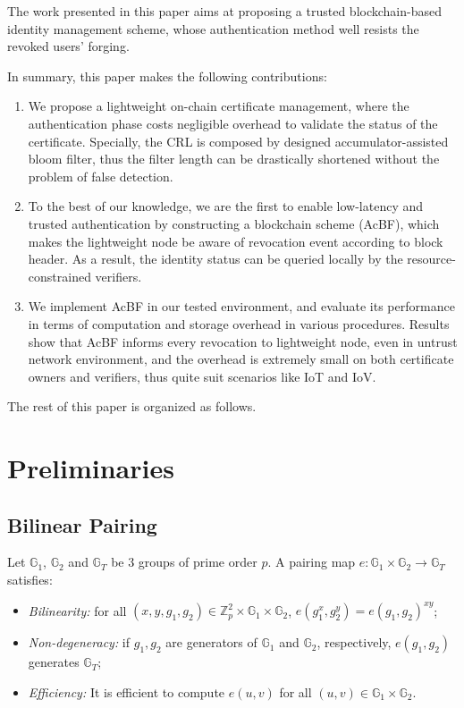 \documentclass[conference]{IEEEtran}
\begin{document}
The work presented in this paper aims at proposing a trusted blockchain-based identity management scheme, whose authentication method well resists the revoked users' forging. 

In summary, this paper makes the following contributions:
\begin{enumerate}
	\item We propose a lightweight on-chain certificate management, where the authentication phase costs negligible overhead to validate the status of the certificate. Specially, the CRL is composed by designed accumulator-assisted bloom filter, thus the filter length can be drastically shortened without the problem of false detection. 
	\item To the best of our knowledge, we are the first to enable low-latency and trusted authentication by constructing a blockchain scheme (AcBF), which makes the lightweight node be aware of revocation event according to block header. As a result, the identity status can be queried locally by the resource-constrained verifiers.
	\item We implement AcBF in our tested environment, and evaluate its performance in terms of computation and storage overhead in various procedures. Results show that AcBF informs every revocation to lightweight node, even in untrust network environment, and the overhead is extremely small on both certificate owners and verifiers, thus quite suit scenarios like IoT and IoV.
\end{enumerate}

The rest of this paper is organized as follows. 


\section{Preliminaries}

\subsection{Bilinear Pairing}
Let $\mathbb{G}_1$, $\mathbb{G}_2$ and $\mathbb{G}_T$ be 3 groups of prime order $p$. A pairing map $e:\mathbb{G}_1\times \mathbb{G}_2\rightarrow\mathbb{G}_T$ satisfies:
\begin{itemize}
	\item \textit{Bilinearity:} for all $(x,y, g_1, g_2) \in \mathbb{Z}_p^2\times \mathbb{G}_1\times \mathbb{G}_2$, $e(g_1^x, g_2^y) = e(g_1, g_2)^{xy}$;
	\item \textit{Non-degeneracy:} if $g_1, g_2$ are generators of $\mathbb{G}_1$ and $\mathbb{G}_2$, respectively, $e(g_1, g_2)$ generates $\mathbb{G}_T$;
	\item \textit{Efficiency:} It is efficient to compute $e(u,v)$ for all $(u, v) \in \mathbb{G}_1\times \mathbb{G}_2$.
\end{itemize}
\end{document}

